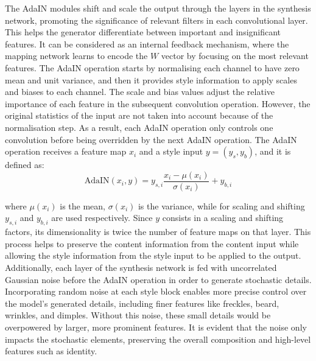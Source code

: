 The AdaIN modules shift and scale the output through the layers in the synthesis network, promoting the significance of relevant filters in each convolutional layer. This helps the generator differentiate between important and insignificant features. It can be considered as an internal feedback mechanism, where the mapping network learns to encode the $W$ vector by focusing on the most relevant features. 
The AdaIN operation starts by normalising each channel to have zero mean and unit variance, and then it provides style information to apply scales and biases to each channel. The scale and bias values adjust the relative importance of each feature in the subsequent convolution operation. However, the original statistics of the input are not taken into account because of the normalisation step. As a result, each AdaIN operation only controls one convolution before being overridden by the next AdaIN operation.
The AdaIN operation receives a feature map $x_i$ and a style input $y=(y_s,y_b)$, and it is defined as:
\begin{equation}
    \mbox{AdaIN}(x_i,y)=y_{s,i}\frac{x_i - \mu (x_i)}{\sigma(x_i)}+y_{b,i}
\end{equation}

\noindent where $\mu(x_i)$ is the mean, $\sigma(x_i)$ is the variance, while for scaling and shifting $y_{s,i}$ and $y_{b,i}$ are used respectively. Since $y$ consists in a scaling and shifting factors, its dimensionality is twice the number of feature maps on that layer.
This process helps to preserve the content information from the content input while allowing the style information from the style input to be applied to the output.
Additionally, each layer of the synthesis network is fed with uncorrelated Gaussian noise before the AdaIN operation in order to generate stochastic details. Incorporating random noise at each style block enables more precise control over the model's generated details, including finer features like freckles, beard, wrinkles, and dimples. Without this noise, these small details would be overpowered by larger, more prominent features. It is evident that the noise only impacts the stochastic elements, preserving the overall composition and high-level features such as identity.\\

